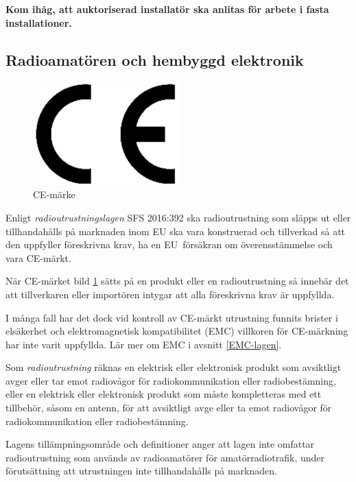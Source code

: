 \textbf{Kom ihåg, att auktoriserad installatör ska anlitas för arbete
i fasta installationer.}

\subsection{Radioamatören och hembyggd elektronik}

\begin{figure}
	\includegraphics[width=0.5\textwidth]{images/cropped_pdfs/CE-mark.pdf}
	\caption{CE-märke}
	\label{fig:CE-mark}
\end{figure}

Enligt \emph{radioutrustningslagen} SFS 2016:392 \cite{SFS2016:392} ska
radioutrustning som släpps ut eller tillhandahålls på marknaden inom EU ska vara
konstruerad och tillverkad så att den uppfyller föreskrivna krav, ha en
EU~försäkran om överensstämmelse och vara CE-märkt.

När CE-märket bild \ref{fig:CE-mark} sätts på en produkt eller en
radioutrustning så innebär det att tillverkaren eller importören intygar att
alla föreskrivna krav är uppfyllda.

I många fall har det dock vid kontroll av CE-märkt utrustning funnits brister
i elsäkerhet och elektromagnetisk kompatibilitet (EMC) villkoren för CE-märkning
har inte varit uppfyllda. Lär mer om EMC i avsnitt \ref{EMC-lagen}.
 
Som \emph{radioutrustning} räknas en elektrisk eller elektronisk produkt som
avsiktligt avger eller tar emot radiovågor för radiokommunikation eller
radiobestämning, eller en elektrisk eller elektronisk produkt som måste
kompletteras med ett tillbehör, såsom en antenn, för att avsiktligt avge
eller ta emot radiovågor för radiokommunikation eller radiobestämning.

Lagens tillämpningsområde och definitioner anger att lagen inte omfattar
radioutrustning som används av radioamatörer för amatörradiotrafik, under
förutsättning att utrustningen inte tillhandahålls på marknaden.

